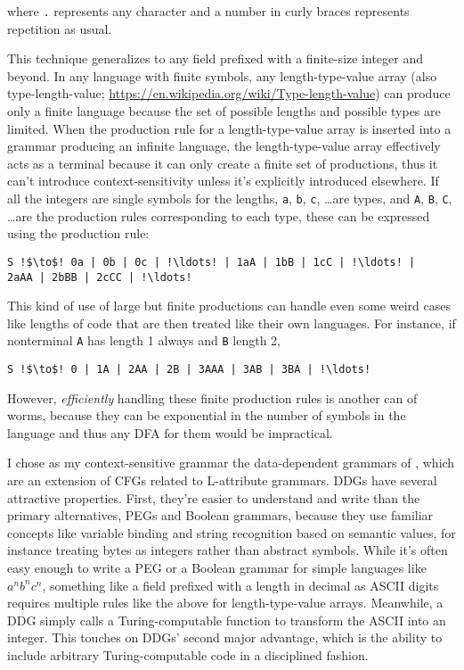 \documentclass[12pt]{article}
\begin{document}
where \texttt{.} represents any character and a number in curly braces
represents repetition as usual.  

This technique generalizes to any field prefixed with a finite-size
integer and beyond.  In any language with finite symbols, any
length-type-value array (also type-length-value;
\url{https://en.wikipedia.org/wiki/Type-length-value}) can produce
only a finite language because the set of possible lengths and
possible types are limited.  When the production rule for a
length-type-value array is inserted into a grammar producing an
infinite language, the length-type-value array effectively acts as a
terminal because it can only create a finite set of productions, thus
it can't introduce context-sensitivity unless it's explicitly
introduced elsewhere.  If all the integers are single symbols for the
lengths, \texttt{a}, \texttt{b}, \texttt{c}, \ldots are types, and
\texttt{A}, \texttt{B}, \texttt{C}, \ldots are the production rules
corresponding to each type, these can be expressed using the
production rule:

\begin{lstlisting}
S !$\to$! 0a | 0b | 0c | !\ldots! | 1aA | 1bB | 1cC | !\ldots! |
2aAA | 2bBB | 2cCC | !\ldots!
\end{lstlisting}

This kind of use of large but finite productions can handle even some
weird cases like lengths of code that are then treated like their own
languages.  For instance, if nonterminal \texttt{A} has length 1
always and \texttt{B} length 2,

\begin{lstlisting}
S !$\to$! 0 | 1A | 2AA | 2B | 3AAA | 3AB | 3BA | !\ldots!
\end{lstlisting}

However, \emph{efficiently} handling these finite production rules is
another can of worms, because they can be exponential in the number of
symbols in the language and thus any DFA for them would be
impractical.

I chose as my context-sensitive grammar the data-dependent grammars of
\textcite{yakker1}, which are an extension of CFGs related to
L-attribute grammars.  DDGs have several attractive properties.
First, they're easier to understand and write than the primary
alternatives, PEGs and Boolean grammars, because they use familiar
concepts like variable binding and string recognition based on
semantic values, for instance treating bytes as integers rather than
abstract symbols.  While it's often easy enough to write a PEG or a
Boolean grammar for simple languages like $a^nb^nc^n$, something like
a field prefixed with a length in decimal as ASCII digits requires
multiple rules like the above for length-type-value arrays.
Meanwhile, a DDG simply calls a Turing-computable function to
transform the ASCII into an integer.  This touches on DDGs' second
major advantage, which is the ability to include arbitrary
Turing-computable code in a disciplined fashion.
\end{document}
